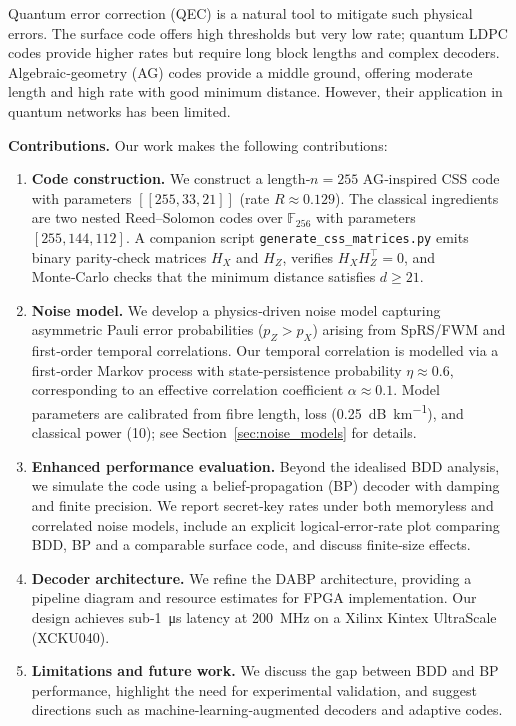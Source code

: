 \documentclass[conference]{IEEEtran}
\begin{document}
    Quantum error correction (QEC) is a natural tool to mitigate such physical errors.  The surface code offers high 
thresholds but very low rate; quantum LDPC codes provide higher rates but require long block lengths and complex 
decoders.  Algebraic‑geometry (AG) codes provide a middle ground, offering moderate length and high rate with good 
minimum distance.  However, their application in quantum networks has been limited.

    \textbf{Contributions.} Our work makes the following contributions:

    \begin{enumerate}[leftmargin=*,itemsep=1pt,topsep=2pt]
      \item \textbf{Code construction.}  We construct a length‑$n=255$ AG‑inspired CSS code with parameters
$[[255,33,21]]$ (rate $R\approx 0.129$).  The classical ingredients are two nested Reed–Solomon codes
over $\mathbb{F}_{256}$ with parameters $[255,144,112]$.  A companion script \texttt{generate\_css\_matrices.py}
emits binary parity‑check matrices $H_X$ and $H_Z$, verifies $H_X H_Z^\top=0$, and Monte‑Carlo checks that the
minimum distance satisfies $d\ge 21$.
      \item \textbf{Noise model.}  We develop a physics‑driven noise model capturing asymmetric Pauli error 
probabilities ($p_Z>p_X$) arising from SpRS/FWM and first‑order temporal correlations.  Our temporal correlation is 
modelled via a first‑order Markov process with state‑persistence probability $\eta\approx 0.6$, corresponding to an 
effective correlation coefficient $\alpha\approx 0.1$.  Model parameters are calibrated from fibre length, loss 
(\SI{0.25}{\dB\per\kilo\meter}), and classical power (\SI{10}{\dBm}); see Section~\ref{sec:noise_models} for details.
      \item \textbf{Enhanced performance evaluation.}  Beyond the idealised BDD analysis, we simulate the code using a 
belief‑propagation (BP) decoder with damping and finite precision.  We report secret‑key rates under both memoryless and
  correlated noise models, include an explicit logical‑error‑rate plot comparing BDD, BP and a comparable surface code, 
and discuss finite‑size effects.
      \item \textbf{Decoder architecture.}  We refine the DABP architecture, providing a pipeline diagram and resource 
estimates for FPGA implementation.  Our design achieves sub‑\SI{1}{\micro\second} latency at \SI{200}{\mega\hertz} on a 
Xilinx Kintex UltraScale (XCKU040).
      \item \textbf{Limitations and future work.}  We discuss the gap between BDD and BP performance, highlight the need
        for experimental validation, and suggest directions such as machine‑learning‑augmented decoders and adaptive codes.
    \end{enumerate}
\end{document}
